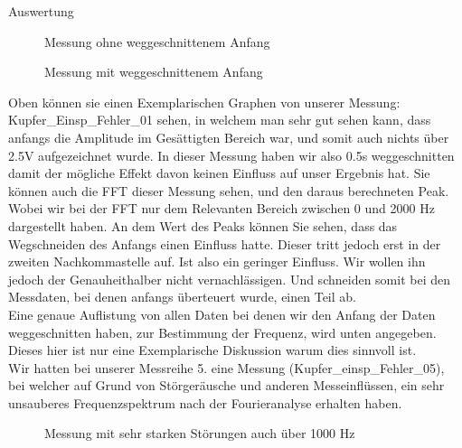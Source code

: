 \documentclass[twoside]{protokoll}
\begin{document}
\begin{aufgabe}{Auswertung}
\begin{figure}[H]
  \centering
  \caption{Messung ohne weggeschnittenem Anfang}
  \hfill
\end{figure}

\begin{figure}[H]
  \centering
  \caption{Messung mit weggeschnittenem Anfang}
  \hfill
\end{figure}

Oben können sie einen Exemplarischen Graphen von unserer Messung: Kupfer\_Einsp\_Fehler\_01 sehen, in welchem man sehr gut sehen kann, dass anfangs die Amplitude im Gesättigten Bereich war, und somit auch nichts über 2.5V aufgezeichnet wurde.
In dieser Messung haben wir also 0.5s weggeschnitten damit der mögliche Effekt davon keinen Einfluss auf unser Ergebnis hat.
Sie können auch die FFT dieser Messung sehen, und den daraus berechneten Peak.
Wobei wir bei der FFT nur dem Relevanten Bereich zwischen 0 und 2000 Hz dargestellt haben.
An dem Wert des Peaks können Sie sehen, dass das Wegschneiden des Anfangs einen Einfluss hatte.
Dieser tritt jedoch erst in der zweiten Nachkommastelle auf.
Ist also ein geringer Einfluss.
Wir wollen ihn jedoch der Genauheithalber nicht vernachlässigen.
Und schneiden somit bei den Messdaten, bei denen anfangs überteuert wurde, einen Teil ab. \\


Eine genaue Auflistung von allen Daten bei denen wir den Anfang der Daten weggeschnitten haben, zur Bestimmung der Frequenz, wird unten angegeben.
Dieses hier ist nur eine Exemplarische Diskussion warum dies sinnvoll ist. \\

Wir hatten bei unserer Messreihe 5. eine Messung (Kupfer\_einsp\_Fehler\_05), bei welcher auf Grund von Störgeräusche und anderen Messeinflüssen, ein sehr unsauberes Frequenzspektrum nach der Fourieranalyse erhalten haben.
\begin{figure}[H]
  \centering
    \caption{Messung mit sehr starken Störungen auch über 1000 Hz}
  \hfill
\end{figure}


\end{aufgabe}
\end{document}
